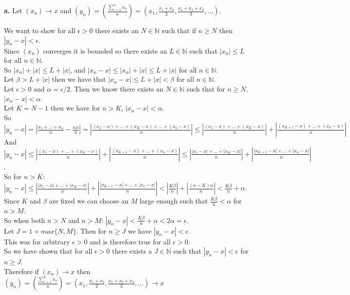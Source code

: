 \documentclass{article}
\begin{document}
{\Large \textbf{a.}} Let $(x_n)\rightarrow x$ and $(y_n) = (\frac{\sum _{i=1}^n x_n}{n}) = (x_1,\frac{x_1 + x_2}{2},\frac{x_1 + x_2 + x_3}{3}, ...)$.
\begin{center}
    \doublespacing
    We want to show for all $\epsilon > 0$ there exists an $N\in\mathbb{N}$ such that if $n\geq N$ then $|y_n - x| <\epsilon$.
    \\Since $(x_n)$ converges it is bounded so there exists an $L\in\mathbb{N}$ such that $|x_n|\leq L$ for all $n\in\mathbb{N}$.
    \\So $|x_n| + |x|\leq L + |x|$, and $|x_n - x|\leq |x_n| + |x|\leq L + |x|$ for all $n\in\mathbb{N}$.
    \\Let $\beta > L + |x|$ then we have that $|x_n - x|\leq L + |x| <\beta$ for all $n\in\mathbb{N}$.
    \\Let $\epsilon > 0$ and $\alpha =\epsilon / 2$. Then we know there exists an $N\in\mathbb{N}$ such that for $n\geq N$, $|x_n - x| <\alpha$.
    \\Let $K = N - 1$ then we have for $n > K$, $|x_n - x| <\alpha$.
    \\So $|y_n - x| = |\frac{x_1 + ... + x_n}{n} -\frac{nx}{n}| = |\frac{(x_1 - x) + ... + (x_K - x) + ...+ (x_n - x)}{n}|\leq |\frac{(x_1 - x) + ... + (x_K - x)}{n}| + |\frac{(x_{K+1} - x) + ... + (x_n - x)}{n}|$
    \\And $|y_n - x|\leq |\frac{(x_1 - x) + ... + (x_K - x)}{n}| + |\frac{(x_{K+1} - x) + ... + (x_n - x)}{n}|\leq |\frac{|x_1 - x| + ... + |x_K - x|}{n}| + |\frac{|x_{K+1} - x| + ... + |x_n - x|}{n}|$.
    \\So for $n > K$: $|y_n - x|\leq |\frac{|x_1 - x| + ... + |x_K - x|}{n}| + |\frac{|x_{K+1} - x| + ... + |x_n - x|}{n}| < |\frac{K\beta}{n}| + |\frac{(n-K)\alpha}{n}| < \frac{K\beta}{n} + \alpha$.
    \\Since $K$ and $\beta$ are fixed we can choose an $M$ large enough such that $\frac{K\beta}{n} <\alpha$ for $n > M$.
    \\So when both $n > N$ and $n > M$: $|y_n - x| < \frac{K\beta}{n} +\alpha < 2\alpha =\epsilon$.
    \\Let $J = 1 + max\{N, M\}$. Then for $n\geq J$ we have $|y_n - x| <\epsilon$.
    \\This was for arbitrary $\epsilon > 0$ and is therefore true for all $\epsilon > 0$.
    \\So we have shown that for all $\epsilon > 0$ there exists a $J\in\mathbb{N}$ such that $|y_n - x| <\epsilon$ for $n\geq J$.
    \\Therefore if $(x_n)\rightarrow x$ then $(y_n) = (\frac{\sum _{i=1}^n x_n}{n}) = (x_1,\frac{x_1 + x_2}{2},\frac{x_1 + x_2 + x_3}{3}, ...)\rightarrow x$ \qedsymbol
\end{center}
\end{document}
